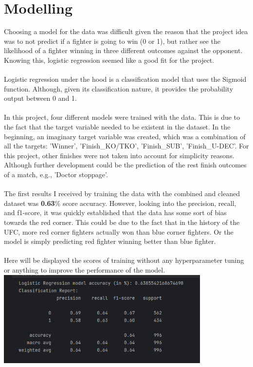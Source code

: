\documentclass{article}
\begin{document}
\section{Modelling}
Choosing a model for the data was difficult given the reason that the project idea was to not predict if a fighter is going to win (0 or 1), but rather see the likelihood of a fighter winning in three different outcomes against the opponent. Knowing this, logistic regression seemed like a good fit for the project.\\\\
Logistic regression under the hood is a classification model that uses the Sigmoid function. Although, given its classification nature, it provides the probability output between 0 and 1.\\\\
In this project, four different models were trained with the data. This is due to the fact that the target variable needed to be existent in the dataset. In the beginning, an imaginary target variable was created, which was a combination of all the targets: 'Winner', 'Finish\_KO/TKO', 'Finish\_SUB', 'Finish\_U-DEC'. For this project, other finishes were not taken into account for simplicity reasons. Although further development could be the prediction of the rest finish outcomes of a match, e.g., 'Doctor stoppage'.\\\\
The first results I received by training the data with the combined and cleaned dataset was \textbf{0.63}\% score accuracy. However, looking into the precision, recall, and f1-score, it was quickly established that the data has some sort of bias towards the red corner. This could be due to the fact that in the history of the UFC, more red corner fighters actually won than blue corner fighters. Or the model is simply predicting red fighter winning better than blue fighter.\\\\
Here will be displayed the scores of training without any hyperparameter tuning or anything to improve the performance of the model.\\

	\includegraphics[width=0.8\textwidth]{images/LR_Scores.png}
\end{document}
